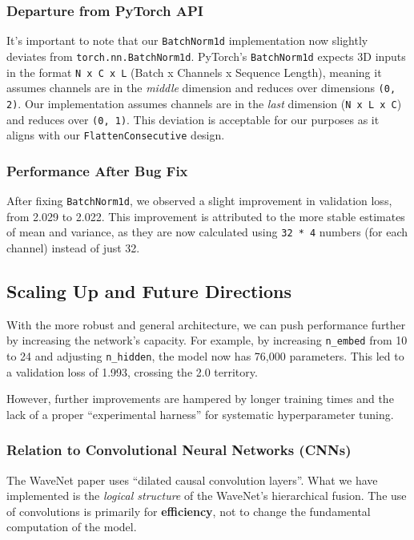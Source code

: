 \subsubsection{Departure from PyTorch API}
It's important to note that our \texttt{BatchNorm1d} implementation now slightly deviates from \texttt{torch.nn.BatchNorm1d}. PyTorch's \texttt{BatchNorm1d} expects 3D inputs in the format \texttt{N x C x L} (Batch x Channels x Sequence Length), meaning it assumes channels are in the \textit{middle} dimension and reduces over dimensions \texttt{(0, 2)}. Our implementation assumes channels are in the \textit{last} dimension (\texttt{N x L x C}) and reduces over \texttt{(0, 1)}. This deviation is acceptable for our purposes as it aligns with our \texttt{FlattenConsecutive} design.

\subsubsection{Performance After Bug Fix}
After fixing \texttt{BatchNorm1d}, we observed a slight improvement in validation loss, from 2.029 to 2.022. This improvement is attributed to the more stable estimates of mean and variance, as they are now calculated using \texttt{32 * 4} numbers (for each channel) instead of just 32.

\subsection{Scaling Up and Future Directions}

With the more robust and general architecture, we can push performance further by increasing the network's capacity. For example, by increasing \texttt{n\_embed} from 10 to 24 and adjusting \texttt{n\_hidden}, the model now has 76,000 parameters. This led to a validation loss of 1.993, crossing the 2.0 territory.

However, further improvements are hampered by longer training times and the lack of a proper ``experimental harness'' for systematic hyperparameter tuning.

\subsubsection{Relation to Convolutional Neural Networks (CNNs)}
The WaveNet paper uses ``dilated causal convolution layers''. What we have implemented is the \textit{logical structure} of the WaveNet's hierarchical fusion. The use of convolutions is primarily for \textbf{efficiency}, not to change the fundamental computation of the model.

